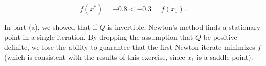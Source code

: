 \begin{solution}
    $$
    f(x^*) = -0.8 < -0.3 = f(x_1).
    $$

    In part (a), we showed that if $Q$ is invertible, Newton's method finds a stationary point in a single iteration. By
    dropping the assumption that $Q$ be positive definite, we lose the ability to guarantee that the first Newton
    iterate minimizes $f$ (which is consistent with the results of this exercise, since $x_1$ is a saddle point).


\end{solution}